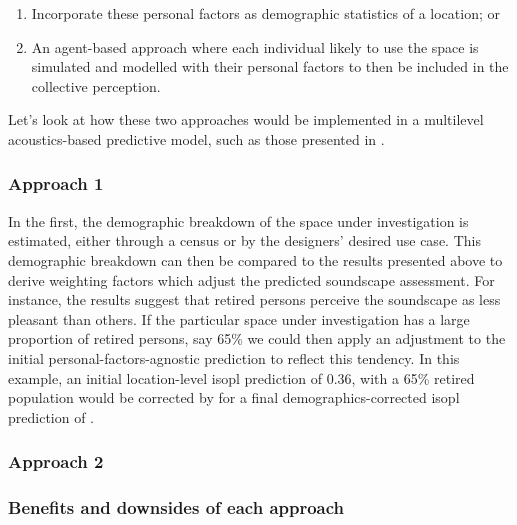 \begin{enumerate}
  \item Incorporate these personal factors as demographic statistics of a location; or
  \item An agent-based approach where each individual likely to use the space is simulated and modelled with their personal factors to then be included in the collective perception.
\end{enumerate}

Let's look at how these two approaches would be implemented in a multilevel acoustics-based predictive model, such as those presented in .

\subsubsection{Approach 1}
In the first, the demographic breakdown of the space under investigation is estimated, either through a census or by the designers' desired use case. This demographic breakdown can then be compared to the results presented above \citep{Erfanian2021Psychological} to derive weighting factors which adjust the predicted soundscape assessment. For instance, the results suggest that retired persons perceive the soundscape as  less pleasant than others. If the particular space under investigation has a large proportion of retired persons, say 65\% we could then apply an adjustment to the initial personal-factors-agnostic prediction to reflect this tendency. In this example, an initial location-level \gls{isopl} prediction of 0.36, with a 65\% retired population would be corrected by  for a final demographics-corrected \gls{isopl} prediction of .

\subsubsection{Approach 2}

\subsubsection{Benefits and downsides of each approach}